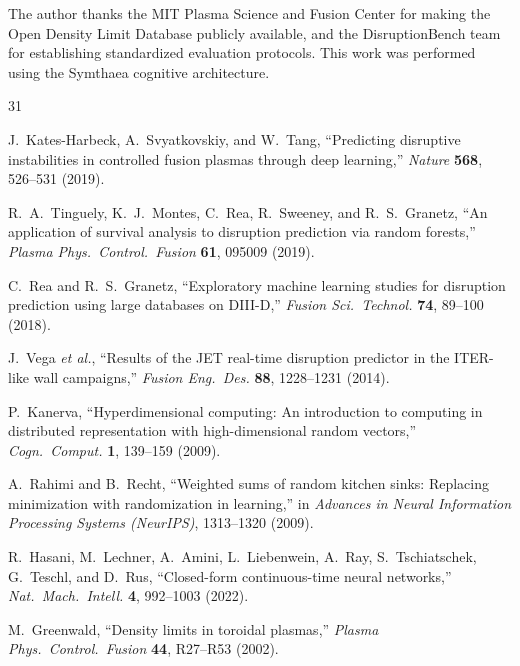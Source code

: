 \documentclass[twocolumn,prl,aps,superscriptaddress,floatfix]{revtex4-2}
\begin{document}
\begin{acknowledgments}
The author thanks the MIT Plasma Science and Fusion Center for making the Open Density Limit Database publicly available, and the DisruptionBench team for establishing standardized evaluation protocols. This work was performed using the Symthaea cognitive architecture.
\end{acknowledgments}

\begin{thebibliography}{31}

J.~Kates-Harbeck, A.~Svyatkovskiy, and W.~Tang,
``Predicting disruptive instabilities in controlled fusion plasmas through deep learning,''
\textit{Nature} \textbf{568}, 526--531 (2019).

R.~A.~Tinguely, K.~J.~Montes, C.~Rea, R.~Sweeney, and R.~S.~Granetz,
``An application of survival analysis to disruption prediction via random forests,''
\textit{Plasma Phys.\ Control.\ Fusion} \textbf{61}, 095009 (2019).

C.~Rea and R.~S.~Granetz,
``Exploratory machine learning studies for disruption prediction using large databases on DIII-D,''
\textit{Fusion Sci.\ Technol.} \textbf{74}, 89--100 (2018).

J.~Vega \textit{et al.},
``Results of the JET real-time disruption predictor in the ITER-like wall campaigns,''
\textit{Fusion Eng.\ Des.} \textbf{88}, 1228--1231 (2014).

P.~Kanerva,
``Hyperdimensional computing: An introduction to computing in distributed representation with high-dimensional random vectors,''
\textit{Cogn.\ Comput.} \textbf{1}, 139--159 (2009).

A.~Rahimi and B.~Recht,
``Weighted sums of random kitchen sinks: Replacing minimization with randomization in learning,''
in \textit{Advances in Neural Information Processing Systems (NeurIPS)}, 1313--1320 (2009).

R.~Hasani, M.~Lechner, A.~Amini, L.~Liebenwein, A.~Ray, S.~Tschiatschek, G.~Teschl, and D.~Rus,
``Closed-form continuous-time neural networks,''
\textit{Nat.\ Mach.\ Intell.} \textbf{4}, 992--1003 (2022).

M.~Greenwald,
``Density limits in toroidal plasmas,''
\textit{Plasma Phys.\ Control.\ Fusion} \textbf{44}, R27--R53 (2002).


\end{thebibliography}
\end{document}
